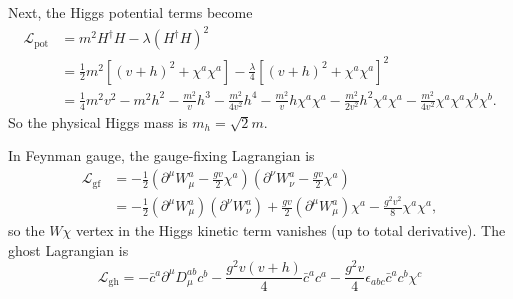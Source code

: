 \documentclass[11pt]{article}
\theoremstyle{definition}
\theoremstyle{remark}
\begin{document}
	Next, the Higgs potential terms become
	\begin{align*}
		\mathcal{L}_{\text{pot}}&=m^{2}H^{\dagger}H-\lambda(H^{\dagger}H)^{2}\\
		&=\frac{1}{2}m^{2}\left[(v+h)^{2}+\chi^{a}\chi^{a}\right]-\frac{\lambda}{4}\left[(v+h)^{2}+\chi^{a}\chi^{a}\right]^{2}\\
		&=\frac{1}{4}m^{2}v^{2}-m^{2}h^{2}-\frac{m^{2}}{v}h^{3}-\frac{m^{2}}{4v^{2}}h^{4}-\frac{m^{2}}{v}h\chi^{a}\chi^{a}-\frac{m^{2}}{2v^{2}}h^{2}\chi^{a}\chi^{a}-\frac{m^{2}}{4v^{2}}\chi^{a}\chi^{a}\chi^{b}\chi^{b}.
	\end{align*}
	So the physical Higgs mass is $m_{h}=\sqrt{2}m$.
	
	In Feynman gauge, the gauge-fixing Lagrangian is
	\begin{align*}
		\mathcal{L}_{\mathrm{gf}}&=-\frac{1}{2}\left(\partial^{\mu}W^{a}_{\mu}-\frac{gv}{2}\chi^{a}\right)\left(\partial^{\nu}W^{a}_{\nu}-\frac{gv}{2}\chi^{a}\right)\\
		&=-\frac{1}{2}(\partial^{\mu}W^{a}_{\mu})(\partial^{\nu}W^{a}_{\nu})+\frac{gv}{2}(\partial^{\mu}W^{a}_{\mu})\chi^{a}-\frac{g^{2}v^{2}}{8}\chi^{a}\chi^{a},
	\end{align*}
	so the $W\chi$ vertex in the Higgs kinetic term vanishes (up to total derivative).
	The ghost Lagrangian is
	\[\mathcal{L}_{\mathrm{gh}}=-\bar{c}^{a}\partial^{\mu}D^{ab}_{\mu}c^{b}-\frac{g^{2}v(v+h)}{4}\bar{c}^{a}c^{a}-\frac{g^{2}v}{4}\epsilon_{abc}\bar{c}^{a}c^{b}\chi^{c}\]
	
\end{document}
